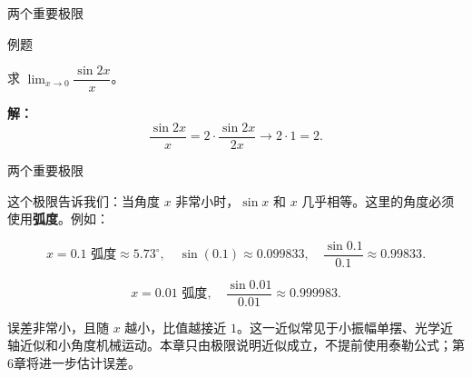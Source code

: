 \documentclass[aspectratio=169,10pt,fontset=fandol]{ctexbeamer}
\newenvironment{custom}[1]{\par\noindent\textbf{#1}\quad}{\par\vspace{0.8em}}
\begin{document}
\begin{frame}[t,fragile]{两个重要极限}
\footnotesize
\begin{block}{例题}
{\footnotesize
求 \(\lim_{x \to 0} \dfrac{\sin 2x}{x}\)。

}
\end{block}
\pause
{\footnotesize
\textbf{解：}
\[
	\dfrac{\sin 2x}{x} = 2 \cdot \dfrac{\sin 2x}{2x} \to 2 \cdot 1 = 2.
	\]

}
\end{frame}
\begin{frame}[t,fragile]{两个重要极限}
\footnotesize
{\footnotesize
\begin{application}[物理：小角度近似]

这个极限告诉我们：当角度 \(x\) 非常小时，\(\sin x\) 和 \(x\) 几乎相等。这里的角度必须使用\textbf{弧度}。例如：

\[
x = 0.1 \text{ 弧度} \approx 5.73^\circ,\quad \sin(0.1) \approx 0.099833,\quad \dfrac{\sin 0.1}{0.1} \approx 0.99833.
\]

\[
x = 0.01 \text{ 弧度},\quad \dfrac{\sin 0.01}{0.01} \approx 0.999983.
\]

误差非常小，且随 \(x\) 越小，比值越接近 $1$。这一近似常见于小振幅单摆、光学近轴近似和小角度机械运动。本章只由极限说明近似成立，不提前使用泰勒公式；第6章将进一步估计误差。

\end{application}
}
\end{frame}
\end{document}
